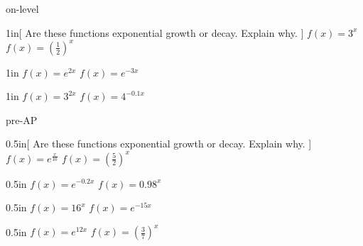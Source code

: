 \begin{taggedblock}{on-level}
    \begin{my2Problems}{1in}[%
        Are these functions exponential growth or decay. Explain why.
    ]
    {
        $f(x) = 3^{x}$
    }
    {
        $f(x) = \left(\frac{1}{2}\right)^x$
    }
    \end{my2Problems}
    \begin{my2Problems}{1in}
    {
        $f(x) = e^{2x}$
    }
    {
        $f(x) = e^{-3x}$
    }
    \end{my2Problems}
    \begin{my2Problems}{1in}
        {
            $f(x) = 3^{2x}$
        }
        {
            $f(x) = 4^{-0.1x}$
        }
    \end{my2Problems}
\end{taggedblock}
\begin{taggedblock}{pre-AP}
    \begin{my2Problems}{0.5in}[%
        Are these functions exponential growth or decay. Explain why.
    ]
    {
        $f(x) = e^{\frac{x}{10}}$
    }
    {
        $f(x) = \left(\frac{5}{2}\right)^x$
    }
    \end{my2Problems}
    \begin{my2Problems}{0.5in}
    {
        $f(x) = e^{-0.2x}$
    }
    {
        $f(x) = 0.98^x$
    }
    \end{my2Problems}
    \begin{my2Problems}{0.5in}
        {
            $f(x) = 16^{x}$
        }
        {
            $f(x) = e^{-15x}$
        }
    \end{my2Problems}
    \begin{my2Problems}{0.5in}
        {
            $f(x) = e^{12x}$
        }
        {
            $f(x) = \left(\frac{3}{7}\right)^{x}$
        }
    \end{my2Problems}
\end{taggedblock}
       